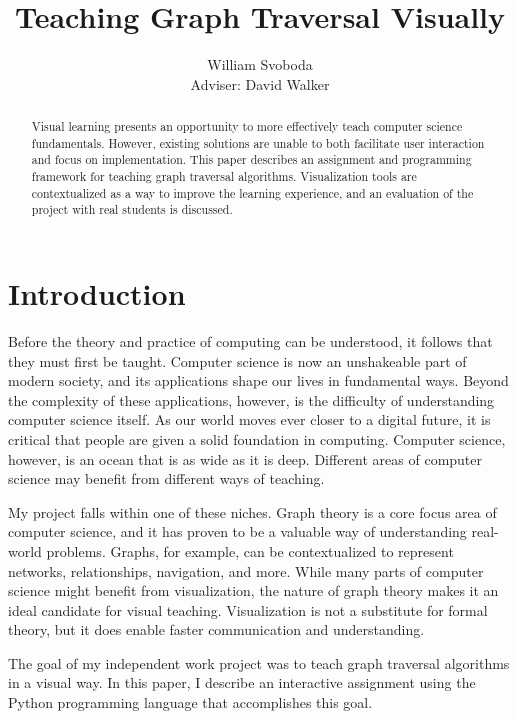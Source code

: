 \documentclass[pageno]{jpaper}
\begin{document}
\title{Teaching Graph Traversal Visually}

\author{William Svoboda\\Adviser: David Walker}

\date{}
\maketitle

\thispagestyle{empty}
\doublespacing
\begin{abstract}
Visual learning presents an opportunity to more effectively teach computer science fundamentals. However, existing solutions are unable to both facilitate user interaction and focus on implementation. This paper describes an assignment and programming framework for teaching graph traversal algorithms. Visualization tools are contextualized as a way to improve the learning experience, and an evaluation of the project with real students is discussed.
\end{abstract}

\section{Introduction}

Before the theory and practice of computing can be understood, it follows that they must first be taught. Computer science is now an unshakeable part of modern society, and its applications shape our lives in fundamental ways. Beyond the complexity of these applications, however, is the difficulty of understanding computer science itself. As our world moves ever closer to a digital future, it is critical that people are given a solid foundation in computing. Computer science, however, is an ocean that is as wide as it is deep. Different areas of computer science may benefit from different ways of teaching.

My project falls within one of these niches. Graph theory is a core focus area of computer science, and it has proven to be a valuable way of understanding real-world problems. Graphs, for example, can be contextualized to represent networks, relationships, navigation, and more. While many parts of computer science might benefit from visualization, the nature of graph theory makes it an ideal candidate for visual teaching. Visualization is not a substitute for formal theory, but it does enable faster communication and understanding.

The goal of my independent work project was to teach graph traversal algorithms in a visual way. In this paper, I describe an interactive assignment using the Python programming language that accomplishes this goal.
\end{document}
